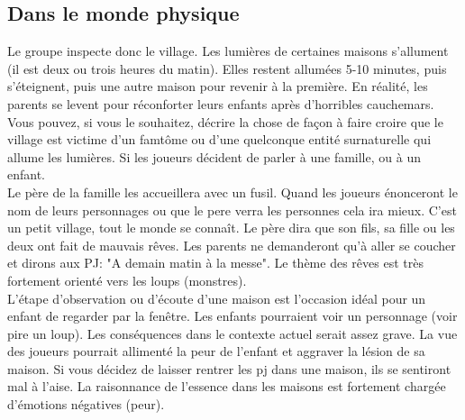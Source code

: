 \documentclass[oneside,12pt]{book}
\begin{document}
\begin{flushleft}
\subsection{Dans le monde physique}
\label{physique_enquete}
Le groupe inspecte donc le village. 
Les lumières de certaines maisons s'allument (il est deux ou trois heures du matin).
Elles restent allumées 5-10 minutes, puis s’éteignent, puis une autre maison pour revenir à la première. 
En réalité, les parents se levent pour réconforter leurs enfants après d'horribles cauchemars. \\
Vous pouvez, si vous le souhaitez, décrire la chose de façon à faire croire que le village est 
victime d'un famtôme ou d'une quelconque entité surnaturelle qui allume les lumières.
Si les joueurs décident de parler à une famille, ou à un enfant. \\
Le père de la famille les accueillera avec un fusil. Quand les joueurs énonceront le nom de leurs personnages ou que le pere verra les personnes cela ira mieux.
C'est un petit village, tout le monde se connaît.
Le père dira que son fils, sa fille ou les deux ont fait de mauvais rêves. 
Les parents ne demanderont qu'à aller se coucher et dirons aux PJ: "A demain matin à la messe".
Le thème des rêves est très fortement orienté vers les loups (monstres). \\
L'étape d'observation ou d'écoute d'une maison est l'occasion idéal pour un enfant de regarder par la fenêtre. Les enfants pourraient voir un personnage (voir pire un loup). Les conséquences dans le contexte actuel serait assez grave. La vue des joueurs pourrait allimenté la peur de l'enfant et aggraver la lésion de sa maison.
Si vous décidez de laisser rentrer les pj dans une maison, ils se sentiront mal à l'aise. La raisonnance de l'essence dans les maisons est fortement chargée d'émotions négatives (peur).


\end{flushleft}
\end{document}
